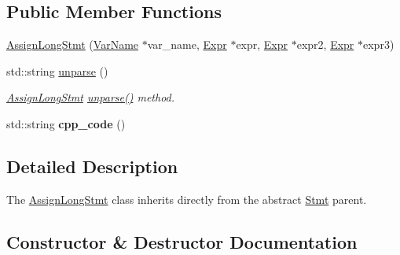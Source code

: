 \subsection*{Public Member Functions}
\begin{DoxyCompactItemize}
\item 
\hyperlink{classfcal_1_1ast_1_1AssignLongStmt_a38d5957840878b0dcb69da9da7975a63}{Assign\+Long\+Stmt} (\hyperlink{classfcal_1_1ast_1_1VarName}{Var\+Name} $\ast$var\+\_\+name, \hyperlink{classfcal_1_1ast_1_1Expr}{Expr} $\ast$expr, \hyperlink{classfcal_1_1ast_1_1Expr}{Expr} $\ast$expr2, \hyperlink{classfcal_1_1ast_1_1Expr}{Expr} $\ast$expr3)
\item 
std\+::string \hyperlink{classfcal_1_1ast_1_1AssignLongStmt_a7ff252236eef89c19c8c13c224cf8b81}{unparse} ()
\begin{DoxyCompactList}\small\item\em \hyperlink{classfcal_1_1ast_1_1AssignLongStmt}{Assign\+Long\+Stmt} \hyperlink{classfcal_1_1ast_1_1AssignLongStmt_a7ff252236eef89c19c8c13c224cf8b81}{unparse()} method. \end{DoxyCompactList}\item 
std\+::string {\bfseries cpp\+\_\+code} ()\hypertarget{classfcal_1_1ast_1_1AssignLongStmt_a77fa27de8fddeff175dae275cc3736c5}{}\label{classfcal_1_1ast_1_1AssignLongStmt_a77fa27de8fddeff175dae275cc3736c5}

\end{DoxyCompactItemize}


\subsection{Detailed Description}
The \hyperlink{classfcal_1_1ast_1_1AssignLongStmt}{Assign\+Long\+Stmt} class inherits directly from the abstract \hyperlink{classfcal_1_1ast_1_1Stmt}{Stmt} parent. 

\subsection{Constructor \& Destructor Documentation}
